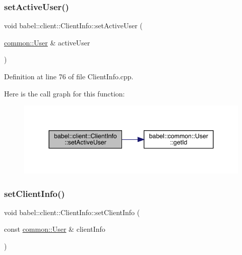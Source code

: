 \subsubsection{\texorpdfstring{set\+Active\+User()}{setActiveUser()}}
{\footnotesize\ttfamily void babel\+::client\+::\+Client\+Info\+::set\+Active\+User (\begin{DoxyParamCaption}\item[{\mbox{\hyperlink{classbabel_1_1common_1_1_user}{common\+::\+User}} \&}]{active\+User }\end{DoxyParamCaption})}



Definition at line 76 of file Client\+Info.\+cpp.

Here is the call graph for this function\+:\nopagebreak
\begin{figure}[H]
\begin{center}
\leavevmode
\includegraphics[width=344pt]{classbabel_1_1client_1_1_client_info_a1c003c4161627708b555d1108cd910f2_cgraph}
\end{center}
\end{figure}
\mbox{\label{classbabel_1_1client_1_1_client_info_ab407de71f67f88b03265ee33f3cb070b}} 
\subsubsection{\texorpdfstring{set\+Client\+Info()}{setClientInfo()}}
{\footnotesize\ttfamily void babel\+::client\+::\+Client\+Info\+::set\+Client\+Info (\begin{DoxyParamCaption}\item[{const \mbox{\hyperlink{classbabel_1_1common_1_1_user}{common\+::\+User}} \&}]{client\+Info }\end{DoxyParamCaption})}



